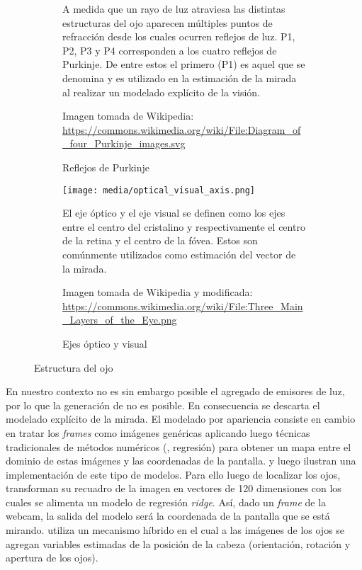 \begin{figure}
    \centering

    \begin{subfigure}{\linewidth}
      \centering

      

      A medida que un rayo de luz atraviesa las distintas estructuras del ojo
      aparecen múltiples puntos de refracción desde los cuales ocurren reflejos
      de luz.
      P1, P2, P3 y P4 corresponden a los cuatro reflejos de Purkinje.
      De entre estos el primero (P1) es aquel que se denomina \glint
      y es utilizado en la estimación de la mirada al realizar un modelado
      explícito de la visión.

      Imagen tomada de Wikipedia:
      \url{https://commons.wikimedia.org/wiki/File:Diagram_of_four_Purkinje_images.svg}

      \caption{Reflejos de Purkinje}
      \label{fig:purkinje_images}
    \end{subfigure}

    \begin{subfigure}{0.7\linewidth}
      \centering

      \texttt{[image: media/optical\_visual\_axis.png]}

      El eje óptico y el eje visual se definen como los ejes entre el centro
      del cristalino y respectivamente el centro de la retina y el centro de la
      fóvea.
      Estos son comúnmente utilizados como estimación del vector de la mirada.

      Imagen tomada de Wikipedia y modificada:
      \url{https://commons.wikimedia.org/wiki/File:Three_Main_Layers_of_the_Eye.png}

      \caption{Ejes óptico y visual}
      \label{fig:optical_visual_axis}
    \end{subfigure}

    \caption{Estructura del ojo}
    \label{fig:eye-structure}
\end{figure}

En nuestro contexto no es sin embargo posible el agregado de emisores de luz,
por lo que la generación de \glints no es posible.
En consecuencia se descarta el modelado explícito de la mirada.
El modelado por apariencia consiste en cambio en tratar los \textit{frames}
como imágenes genéricas aplicando luego técnicas tradicionales de métodos
numéricos (\eg, regresión) para obtener un mapa entre el dominio de estas
imágenes y las coordenadas de la pantalla.
\turkergaze \cite{xu_2015_turker_gaze} y luego \webgazer
\cite{papoutsaki_2016_webgazer} ilustran una implementación de este tipo de
modelos.
Para ello luego de localizar los ojos, transforman su recuadro de la imagen en
vectores de 120 dimensiones con los cuales se alimenta un modelo de regresión
\textit{ridge}.
Así, dado un \textit{frame} de la webcam, la salida del modelo será la
coordenada de la pantalla que se está mirando.
\pace \cite{huang_2016_pace} utiliza un mecanismo híbrido en el cual a las
imágenes de los ojos se agregan variables estimadas de la posición de la cabeza
(orientación, rotación y apertura de los ojos).

